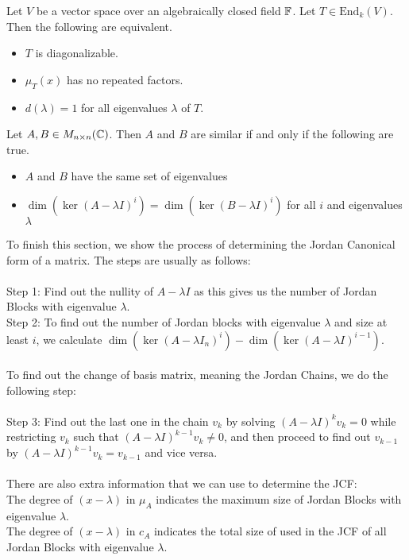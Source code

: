 \documentclass[a4paper]{article}
\begin{document}
\begin{prp}{}{} Let $V$ be a vector space over an algebraically closed field $\mathbb{F}$. Let $T\in\text{End}_k(V)$. Then the following are equivalent. 
\begin{itemize}
\item $T$ is diagonalizable. 
\item $\mu_T(x)$ has no repeated factors. 
\item $d(\lambda)=1$ for all eigenvalues $\lambda$ of $T$. 
\end{itemize}
\end{prp}

\begin{prp}{}{} Let $A,B\in M_{n\times n}(\mathbb{C})$. Then $A$ and $B$ are similar if and only if the following are true. 
\begin{itemize}
\item $A$ and $B$ have the same set of eigenvalues
\item $\dim(\ker(A-\lambda I)^i)=\dim(\ker(B-\lambda I)^i)$ for all $i$ and eigenvalues $\lambda$ 
\end{itemize}
\end{prp}

To finish this section, we show the process of determining the Jordan Canonical form of a matrix. The steps are usually as follows: \\~\\
Step 1: Find out the nullity of $A-\lambda I$ as this gives us the number of Jordan Blocks with eigenvalue $\lambda$. \\
Step 2: To find out the number of Jordan blocks with eigenvalue $\lambda$ and size at least $i$, we calculate $\dim(\ker(A-\lambda I_n)^i)-\dim(\ker(A-\lambda I)^{i-1})$. \\~\\
To find out the change of basis matrix, meaning the Jordan Chains, we do the following step: \\~\\
Step 3: Find out the last one in the chain $v_k$ by solving $(A-\lambda I)^kv_k=0$ while restricting $v_k$ such that $(A-\lambda I)^{k-1}v_k\neq 0$, and then proceed to find out $v_{k-1}$ by $(A-\lambda I)^{k-1}v_k=v_{k-1}$ and vice versa. \\~\\

There are also extra information that we can use to determine the JCF: \\
The degree of $(x-\lambda)$ in $\mu_A$ indicates the maximum size of Jordan Blocks with eigenvalue $\lambda$. \\
The degree of $(x-\lambda)$ in $c_A$ indicates the total size of used in the JCF of all Jordan Blocks with eigenvalue $\lambda$. \\~\\
\end{document}
